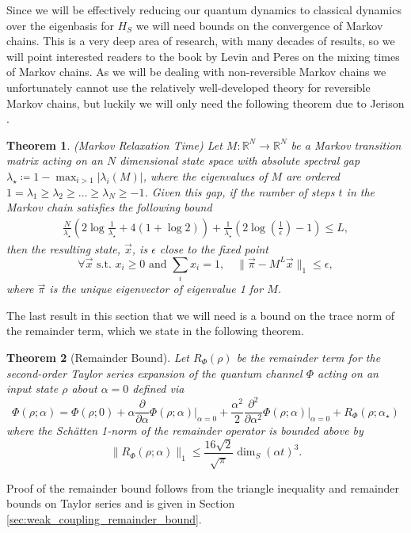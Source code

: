 \documentclass{article}
\newtheorem{theorem}{Theorem}
\newcommand{\norm}[1]{\| #1 \|}
\begin{document}
Since we will be effectively reducing our quantum dynamics to classical dynamics over the eigenbasis for $H_S$ we will need bounds on the convergence of Markov chains. This is a very deep area of research, with many decades of results, so we will point interested readers to the book by Levin and Peres \cite{levin2017markov} on the mixing times of Markov chains. As we will be dealing with non-reversible Markov chains we unfortunately cannot use the relatively well-developed theory for reversible Markov chains, but luckily we will only need the following theorem due to Jerison \cite{jerison2013general}.
\begin{theorem}(Markov Relaxation Time) \label{thm:markov_chain_bound}
    Let $M : \mathbb{R}^{N} \to  \mathbb{R}^{N}$ be a Markov transition matrix acting on an $N$ dimensional state space with absolute spectral gap $\lambda_{\star} \coloneqq 1 - \max_{i > 1} |\lambda_i(M)|$, where the eigenvalues of $M$ are ordered $1 = \lambda_1 \ge \lambda_2 \ge \ldots \ge \lambda_N \geq -1$. Given this gap, if the number of steps $t$ in the Markov chain satisfies the following bound
    \begin{align}
        \frac{N}{\lambda_{\star}} \left( 2\log \frac{1}{\lambda_{\star}} + 4(1 + \log 2)\right) + \frac{1}{\lambda_{\star}} \left(2 \log \left( \frac{1}{\epsilon} \right) - 1\right) \le L,
    \end{align}
    then the resulting state, $\vec{x}$, is $\epsilon$ close to the fixed point
    \begin{equation}
        \forall \vec{x} \text{ s.t. } x_i \ge 0 \text{ and } \sum_i x_i = 1, \quad \norm{\vec{\pi} - M^L \vec{x}}_1 \le \epsilon,
    \end{equation}
    where $\vec{\pi}$ is the unique eigenvector of eigenvalue 1 for $M$.
\end{theorem}

The last result in this section that we will need is a bound on the trace norm of the remainder term, which we state in the following theorem.
\begin{theorem}[Remainder Bound] \label{lem:remainder_bound}
    Let $R_{\Phi}(\rho)$ be the remainder term for the second-order Taylor series expansion 
of the quantum channel $\Phi$ acting on an input state $\rho$ about $\alpha=0$ defined via
    $$\Phi(\rho; \alpha) = \Phi(\rho; 0) + \alpha \frac{\partial}{\partial \alpha} \Phi(\rho; \alpha) \big|_{\alpha = 0} + \frac{\alpha^2}{2} \frac{\partial^2}{\partial \alpha^2} \Phi(\rho; \alpha) \big|_{\alpha = 0} + R_{\Phi}(\rho; \alpha_{\star})$$ where the Sch\"{a}tten 1-norm of the remainder operator is bounded above by
    \begin{equation}
        \norm{R_{\Phi}(\rho;\alpha)}_1 \le \frac{16 \sqrt{2}}{\sqrt{\pi}} \dim_S (\alpha t)^3.
    \end{equation}
\end{theorem}
Proof of the remainder bound follows from the triangle inequality and remainder bounds on Taylor series and is given in Section \ref{sec:weak_coupling_remainder_bound}.
\end{document}
